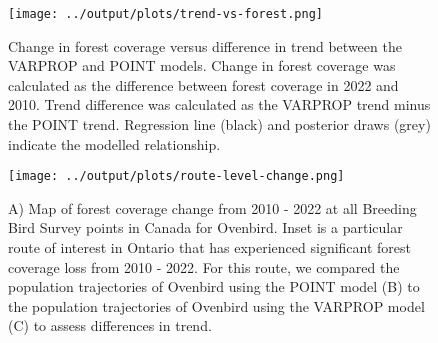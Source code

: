 \documentclass[12pt]{article}
\begin{document}
\begin{figure}[h]
	\texttt{[image: ../output/plots/trend-vs-forest.png]}
	\caption{Change in forest coverage versus difference in trend between the VARPROP and POINT models. Change in forest coverage was calculated as the difference between forest coverage in 2022 and 2010. Trend difference was calculated as the VARPROP trend minus the POINT trend. Regression line (black) and posterior draws (grey) indicate the modelled relationship.}
	\label{fig:trend-vs-forest}
\end{figure}

\begin{figure}[h]
	\texttt{[image: ../output/plots/route-level-change.png]}
	\caption{A) Map of forest coverage change from 2010 - 2022 at all Breeding Bird Survey points in Canada for Ovenbird. Inset is a particular route of interest in Ontario that has experienced significant forest coverage loss from 2010 - 2022. For this route, we compared the population trajectories of Ovenbird using the POINT model (B) to the population trajectories of Ovenbird using the VARPROP model (C) to assess differences in trend.}
	\label{fig:route-change}
\end{figure}
\end{document}
